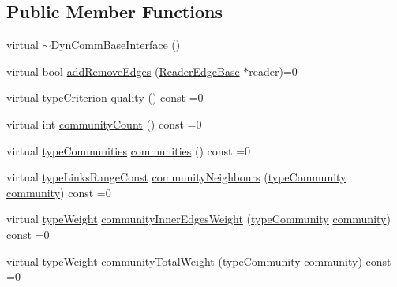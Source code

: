\subsection*{Public Member Functions}
\begin{DoxyCompactItemize}
\item 
virtual \hyperlink{classDynCommBaseInterface_a1bc41ad0bdef6a4d8370ba640a271b33}{$\sim$\+Dyn\+Comm\+Base\+Interface} ()
\item 
virtual bool \hyperlink{classDynCommBaseInterface_a08720be341a0e75c3535749219f7377b}{add\+Remove\+Edges} (\hyperlink{DynCommBaseInterface_8h_a78c081a2dec12142bd4225d9ee662d82}{Reader\+Edge\+Base} $\ast$reader)=0
\item 
virtual \hyperlink{criterionInterface_8h_af71ff22f6355fd69a4a62104bfd59a83}{type\+Criterion} \hyperlink{classDynCommBaseInterface_a42863260fe57e0982be227255d4f8464}{quality} () const =0
\item 
virtual int \hyperlink{classDynCommBaseInterface_aa61588ce385fd66855e17747cf188a85}{community\+Count} () const =0
\item 
virtual \hyperlink{graphUndirectedGroupable_8h_ab79c7252155ca17cb49aa0b1fea30116}{type\+Communities} \hyperlink{classDynCommBaseInterface_aedba7e43ae301ab910340f1d766d1698}{communities} () const =0
\item 
virtual \hyperlink{graphInterface_8h_ae8d27008f15586bbf419af7ad2e0a48a}{type\+Links\+Range\+Const} \hyperlink{classDynCommBaseInterface_afbae10b36098f57576378255d9c09faf}{community\+Neighbours} (\hyperlink{graphUndirectedGroupable_8h_a914da95c9ea7f14f4b7f875c36818556}{type\+Community} \hyperlink{classDynCommBaseInterface_a9453a177580033aa1d4d9f165350ceba}{community}) const =0
\item 
virtual \hyperlink{edge_8h_a2e7ea3be891ac8b52f749ec73fee6dd2}{type\+Weight} \hyperlink{classDynCommBaseInterface_a0e68dcfcc55385ce60b000d76ccd2d86}{community\+Inner\+Edges\+Weight} (\hyperlink{graphUndirectedGroupable_8h_a914da95c9ea7f14f4b7f875c36818556}{type\+Community} \hyperlink{classDynCommBaseInterface_a9453a177580033aa1d4d9f165350ceba}{community}) const =0
\item 
virtual \hyperlink{edge_8h_a2e7ea3be891ac8b52f749ec73fee6dd2}{type\+Weight} \hyperlink{classDynCommBaseInterface_a06e0b8a06e9c1067e12f574458db3eb0}{community\+Total\+Weight} (\hyperlink{graphUndirectedGroupable_8h_a914da95c9ea7f14f4b7f875c36818556}{type\+Community} \hyperlink{classDynCommBaseInterface_a9453a177580033aa1d4d9f165350ceba}{community}) const =0
\item 

\end{DoxyCompactItemize}
